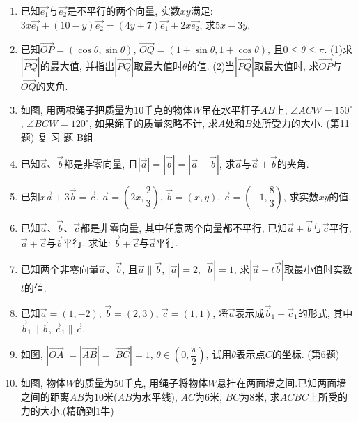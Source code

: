 \documentclass[10pt,a4paper]{article}
\begin{document}
\begin{enumerate}[1.]
\item 已知$\overrightarrow{e_1}$与$\overrightarrow{e_2}$是不平行的两个向量, 实数$xy$满足: $3x\overrightarrow{e_1}+(10-y)\overrightarrow{e_2}=(4y+7)\overrightarrow{e_1}+2x\overrightarrow{e_2}$, 求$5x-3y$.
\item 已知$\overrightarrow{OP}=(\cos \theta ,\sin \theta)$, $\overrightarrow{OQ}=(1+\sin \theta ,1+\cos \theta)$, 且$0\le \theta \le \pi$.
(1)求$|\overrightarrow{PQ}|$的最大值, 并指出$|\overrightarrow{PQ}|$取最大值时$\theta$的值.
(2)当$|\overrightarrow{PQ}|$取最大值时, 求$\overrightarrow{OP}$与$\overrightarrow{OQ}$的夹角.
\item 如图, 用两根绳子把质量为$10$千克的物体$W$吊在水平杆子$AB$上, $\angle ACW=150^{\circ }$, $\angle BCW=120^{\circ }$, 如果绳子的质量忽略不计, 求$A$处和$B$处所受力的大小.
(第11题)
复 习 题
B组
\item 已知$\overrightarrow a$、$\overrightarrow b$都是非零向量, 且$|\overrightarrow a|=|\overrightarrow b|=|\overrightarrow a-\overrightarrow b|$, 求$\overrightarrow a$与$\overrightarrow a+\overrightarrow b$的夹角.
\item 已知$x\overrightarrow a+3\overrightarrow b=\overrightarrow c$, $\overrightarrow a=(2x,\dfrac 23)$, $\overrightarrow b=(x,y)$, $\overrightarrow c=(-1,\dfrac 83)$, 求实数$xy$的值.
\item 已知$\overrightarrow a$、$\overrightarrow b$、$\overrightarrow c$都是非零向量, 其中任意两个向量都不平行, 已知$\overrightarrow a+\overrightarrow b$与$\overrightarrow c$平行, $\overrightarrow a+\overrightarrow c$与$\overrightarrow b$平行, 求证: $\overrightarrow b+\overrightarrow c$与$\overrightarrow a$平行.
\item 已知两个非零向量$\overrightarrow a$、$\overrightarrow b$, 且$\overrightarrow a\parallel \overrightarrow b$, $|\overrightarrow a|=2$, $|\overrightarrow b|=1$, 求$|\overrightarrow a+t\overrightarrow b|$取最小值时实数$t$的值.
\item 已知$\overrightarrow a=(1,-2)$, $\overrightarrow b=(2,3)$, $\overrightarrow c=(1,1)$, 将$\overrightarrow a$表示成$\overrightarrow b_1+\overrightarrow c_1$的形式, 其中$\overrightarrow b_1\parallel \overrightarrow b$, $\overrightarrow c_1\parallel \overrightarrow c$.
\item 如图, $|\overrightarrow{OA}|=|\overrightarrow{AB}|=|\overrightarrow{BC}|=1$, $\theta \in (0,\dfrac{\pi }2)$, 试用$\theta$表示点$C$的坐标.
(第6题)
\item 如图, 物体$W$的质量为$50$千克, 用绳子将物体$W$悬挂在两面墙之间.已知两面墙之间的距离$AB$为$10$米($AB$为水平线), $AC$为$6$米, $BC$为$8$米, 求$ACBC$上所受的力的大小.(精确到$1$牛)

\end{enumerate}
\end{document}
